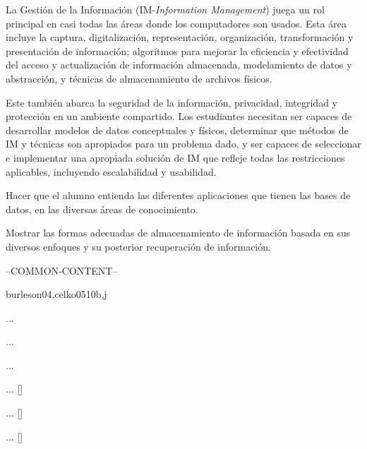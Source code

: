 \begin{syllabus}

	
	\begin{justification}
	La Gestión de la Información (IM-\textit{Information Management}) juega un rol principal en casi todas las áreas donde los computadores son usados. Esta área incluye la captura, digitalización, representación, organización, transformación y presentación de información; algorítmos para mejorar la eficiencia y efectividad del acceso y actualización de información almacenada, modelamiento de datos y abstracción, y técnicas de almacenamiento de archivos físicos.
	
	Este también abarca la seguridad de la información, privacidad, integridad y protección en un ambiente compartido. Los estudiantes necesitan ser capaces de desarrollar modelos de datos conceptuales y físicos, determinar que métodos de IM y técnicas son apropiados para un problema dado, y ser capaces de seleccionar e implementar una apropiada solución de IM que refleje todas las restricciones aplicables, incluyendo escalabilidad y usabilidad.
	\end{justification}
	
	\begin{goals}
	\item Hacer que el alumno entienda las diferentes aplicaciones que tienen las bases de datos, en las diversas áreas de conocimiento.
	\item Mostrar las formas adecuadas de almacenamiento de información basada en sus diversos enfoques y su posterior recuperación de información.
	\end{goals}
	
	--COMMON-CONTENT--
	
	\begin{unit}{\IMPhysicalDatabaseDesign}{}{burleson04,celko05}{10}{b,j}
	\begin{topics}%
		\item ...
		\item ...
		\item ...
	\end{topics}
	\begin{learningoutcomes}
		\item ... [\Usage]
		\item ... [\Usage]
		\item ... [\Usage]
	\end{learningoutcomes}
	\end{unit}
	
	\begin{coursebibliography}
	\end{coursebibliography}
	
	\end{syllabus}
	
	